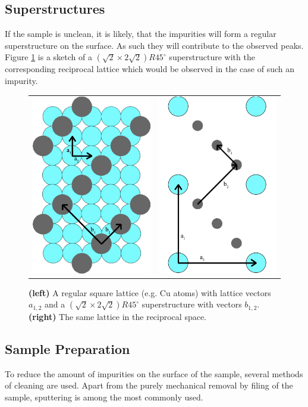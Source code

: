 \documentclass[a4paper]{scrartcl}
\numberwithin{equation}{section}
\numberwithin{figure}{section}
\numberwithin{table}{section}
\begin{document}
\subsection{Superstructures}
If the sample is unclean, it is likely, that the impurities will form a regular superstructure on the surface. As such they will contribute to the observed peaks. Figure \ref{fig:superstructure} is a sketch of a $(\sqrt{2} \times 2\sqrt{2})R45^\circ$ superstructure with the corresponding reciprocal lattice which would be observed in the case of such an impurity.
\begin{figure}[!bthp]
        \begin{center}
        \begin{tabular}{l r}
        		\includegraphics[width=0.2\linewidth]{pic/superstructure.pdf}
       	&
       		\includegraphics[width=0.2\linewidth]{pic/superstructure2.pdf}
		  \end{tabular}
        \end{center}
        \caption{
			\small \textbf{(left)} A regular square lattice (e.g. Cu atoms) with lattice vectors $a_{1,2}$ and a  $(\sqrt{2} \times 2\sqrt{2})R45^\circ$ superstructure with vectors $b_{1,2}$.
			\textbf{(right)} The same lattice in the reciprocal space.
        }
        \label{fig:superstructure}
\end{figure}


\subsection{Sample Preparation}
To reduce the amount of impurities on the surface of the sample, several methods of cleaning are used. Apart from the purely mechanical removal by filing of the sample, sputtering is among the most commonly used. 
\end{document}
